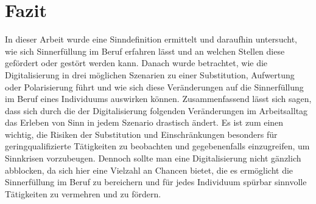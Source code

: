 \chapter{Fazit}
In dieser Arbeit wurde eine Sinndefinition ermittelt und daraufhin untersucht, wie sich Sinnerfüllung im Beruf erfahren lässt und an welchen Stellen diese gefördert oder gestört werden kann. Danach wurde betrachtet, wie die Digitalisierung in drei möglichen Szenarien zu einer Substitution, Aufwertung oder Polarisierung führt und wie sich diese Veränderungen auf die Sinnerfüllung im Beruf eines Individuums auswirken können. Zusammenfassend lässt sich sagen, dass sich durch die der Digitalisierung folgenden Veränderungen im Arbeitsalltag das Erleben von Sinn in jedem Szenario drastisch ändert. Es ist zum einen wichtig, die Risiken der Substitution und Einschränkungen besonders für geringqualifizierte Tätigkeiten zu beobachten und gegebenenfalls einzugreifen, um Sinnkrisen vorzubeugen. Dennoch sollte man eine Digitalisierung nicht gänzlich abblocken, da sich hier eine Vielzahl an Chancen bietet, die es ermöglicht die Sinnerfüllung im Beruf zu bereichern und für jedes Individuum spürbar sinnvolle Tätigkeiten zu vermehren und zu fördern. 